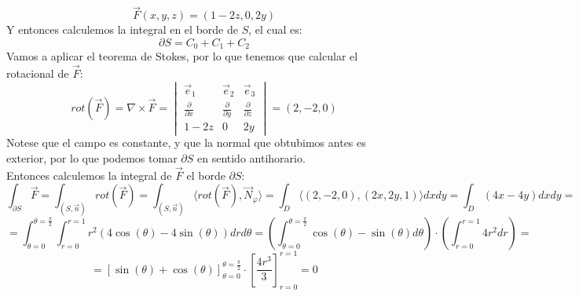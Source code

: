 {    $$ \vec{F}(x,y,z) = (1-2z,0,2y)$$
    Y entonces calculemos la integral en el borde de $S$, el cual es:
    $$ \partial S = C_0 + C_1 + C_2$$
    Vamos a aplicar el teorema de Stokes, por lo que tenemos que calcular el rotacional de $\vec{F}$:
    $$ rot(\vec{F}) = \nabla \times \vec{F} = \begin{vmatrix}
        \vec{e}_1 & \vec{e}_2 & \vec{e}_3 \\
        \frac{\partial}{\partial x} & \frac{\partial}{\partial y} & \frac{\partial}{\partial z} \\
        1 - 2z & 0 & 2y
    \end{vmatrix} = \left( 2, -2, 0 \right)$$
    Notese que el campo es constante, y que la normal que obtubimos antes es exterior, por lo que podemos tomar $\partial S$ en sentido antihorario.\\
    Entonces calculemos la integral de $\vec{F}$ el borde $\partial S$:
    $$ \int_{\partial S} \vec{F} = \int_{(S, \vec{n})} rot(\vec{F}) = \int_{(S, \vec{n})} \langle rot(\vec{F}), \vec{N}_\varphi \rangle = \int_{D} \langle (2, -2, 0), (2x, 2y, 1) \rangle dx dy = \int_{D} (4x - 4y) dx dy=$$
    $$= \int_{\theta = 0}^{\theta = \frac{\pi}{2}} \int_{r=0}^{r=1} r^2 (4 \cos(\theta) - 4 \sin(\theta)) dr d\theta = \left( \int_{\theta = 0}^{\theta = \frac{\pi}{2}} \cos(\theta) - \sin(\theta) d\theta \right) \cdot \left( \int_{r=0}^{r=1} 4r^2 dr \right) =$$
    $$= \left[ \sin(\theta) + \cos(\theta) \right]_{\theta = 0}^{\theta = \frac{\pi}{2}} \cdot \left[ \frac{4r^3}{3} \right]_{r=0}^{r=1} = 0$$
}

